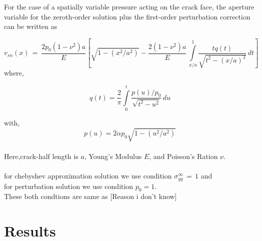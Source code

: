\documentclass[authoryear,12pt]{elsarticle}
\begin{document}
	
	For the case of a spatially variable pressure acting on the crack face, the aperture variable for the zeroth-order solution plus the first-order perturbation correction can be written as \citep{sneddon1969crack}
	
	\begin{equation}\label{12}
		v_{sn}(x)\,=\,\frac{2p_0(1-\nu^2)a}{E}\left[\sqrt{1-\left(x^2/a^2\right)}-\frac{2(1-\nu^2)a}{E}\,\int\limits_{x/a}^1 \frac{tq(t)}{\sqrt{t^2-(x/a)^2}}\,dt\right]
	\end{equation}
	where,
	
	\begin{equation} \label{13}
		q(t) = \frac{2}{\pi}\int\limits_{0}^t \frac{p(u)/p_{0}}{\sqrt{t^2-u^2}}\,du
	\end{equation}
	
	with,
	\begin{equation} \label{14}
		p(u) = 2\alpha p_{0}\sqrt{1-\left(u^2/a^2\right)}	
	\end{equation}\\
	Here,crack-half length is \(a\), Young's Modulus \(E\), and Poisson's Ration \(\nu\).
	\\
	\\
	for chebyshev approximation solution we use condition \(\sigma^{\infty}_{yy} \,=\, 1  \) and\\
	for perturbation solution we use condition \(p_0 = 1\).\\
	These both condtions are same as [Reason i don't know]
	
	\newpage
	\section{Results}
\end{document}
